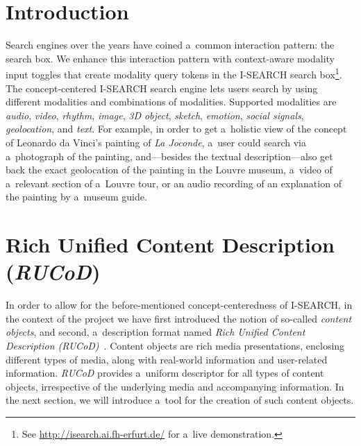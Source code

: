 \documentclass[runningheads,a4paper]{llncs}
\begin{document}
\section{Introduction}
Search engines over the years have coined a~common interaction pattern:
the search box.
We enhance this interaction pattern with context-aware modality input toggles
that create modality query tokens in the \mbox{I-SEARCH} search
box\footnote{See \url{http://isearch.ai.fh-erfurt.de/} for a~live demonstration.}.
The concept-centered \mbox{I-SEARCH} search engine lets users search
by using different modalities and combinations of modalities.
Supported modalities are \emph{audio}, \emph{video},
\emph{rhythm}, \emph{image}, \emph{3D object}, \emph{sketch}, \emph{emotion},
\emph{social signals}, \emph{geolocation}, and \emph{text}.
For example, in order to get a~holistic view of the concept of
Leonardo da Vinci's painting of \emph{La Joconde},
a~user could search via a~photograph of the painting,
and---besides the textual description---also get back
the exact geolocation of the painting in the Louvre museum,
a~video of a~relevant section of a~Louvre tour,
or an audio recording of an explanation of the painting by a~museum guide.

\section{Rich Unified Content Description (\emph{RUCoD})}
In order to allow for the before-mentioned concept-centeredness of
\mbox{I-SEARCH}, in the context of the project we have first introduced
the notion of so-called \emph{content objects}, and second,
a~description format named \emph{Rich Unified Content Description
\mbox{(RUCoD)}}~\cite{ijmis2010}.
Content objects are rich media presentations, enclosing different types of media,
along with real-world information and user-related information.
\mbox{\emph{RUCoD}} provides a~uniform descriptor for all types of content objects,
irrespective of the underlying media and accompanying information.
In the next section, we will introduce a~tool for the creation of such content objects.
\end{document}
